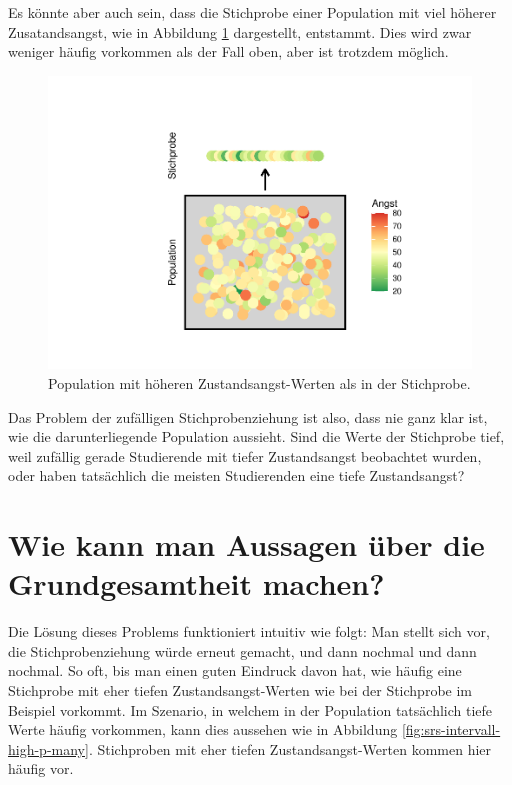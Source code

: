 \documentclass[
]{book}
\theoremstyle{definition}
\theoremstyle{definition}
\theoremstyle{definition}
\theoremstyle{definition}
\theoremstyle{remark}
\begin{document}
Es könnte aber auch sein, dass die Stichprobe einer Population mit viel höherer Zusatandsangst, wie in Abbildung \ref{fig:srs-intervall-low-p} dargestellt, entstammt. Dies wird zwar weniger häufig vorkommen als der Fall oben, aber ist trotzdem möglich.

\begin{figure}
\centering
\includegraphics{aps_statistik1_files/figure-latex/srs-intervall-low-p-1.pdf}
\caption{\label{fig:srs-intervall-low-p}Population mit höheren Zustandsangst-Werten als in der Stichprobe.}
\end{figure}

Das Problem der zufälligen Stichprobenziehung ist also, dass nie ganz klar ist, wie die darunterliegende Population aussieht. Sind die Werte der Stichprobe tief, weil zufällig gerade Studierende mit tiefer Zustandsangst beobachtet wurden, oder haben tatsächlich die meisten Studierenden eine tiefe Zustandsangst?

\section{Wie kann man Aussagen über die Grundgesamtheit machen?}\label{stichprobenziehung-luxf6sung}

Die Lösung dieses Problems funktioniert intuitiv wie folgt: Man stellt sich vor, die Stichprobenziehung würde erneut gemacht, und dann nochmal und dann nochmal. So oft, bis man einen guten Eindruck davon hat, wie häufig eine Stichprobe mit eher tiefen Zustandsangst-Werten wie bei der Stichprobe im Beispiel vorkommt. Im Szenario, in welchem in der Population tatsächlich tiefe Werte häufig vorkommen, kann dies aussehen wie in Abbildung \ref{fig:srs-intervall-high-p-many}. Stichproben mit eher tiefen Zustandsangst-Werten kommen hier häufig vor.
\end{document}
